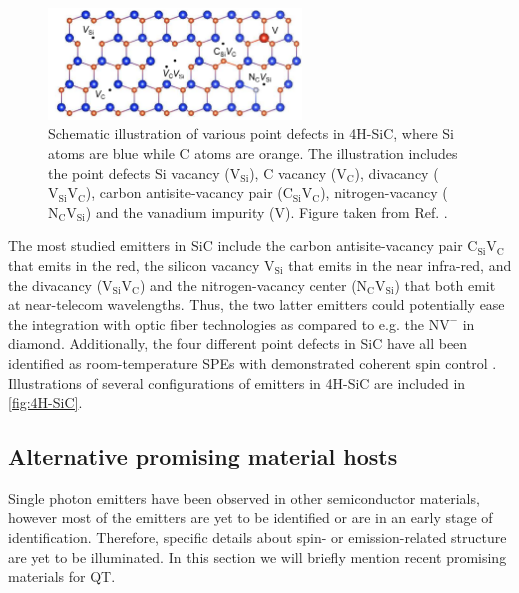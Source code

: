 \begin{figure}
  \centering
  \includegraphics[width=0.6\textwidth]{theory/figures/4H-SiC.png}
  \caption{Schematic illustration of various point defects in 4H-SiC, where Si atoms are blue while C atoms are orange. The illustration includes the point defects Si vacancy ($\text{V}_{\text{Si}}$), C vacancy ($\text{V}_{\text{C}}$), divacancy ($\text{V}_{\text{Si}}\text{V}_{\text{C}}$), carbon antisite-vacancy pair ($\text{C}_{\text{Si}}\text{V}_{\text{C}}$), nitrogen-vacancy ($\text{N}_{\text{C}}\text{V}_{\text{Si}}$) and the vanadium impurity ($\text{V}$). Figure taken from Ref. \cite{Bathen2020}.}
  \label{fig:4H-SiC}
\end{figure}

The most studied emitters in SiC include the carbon antisite-vacancy pair $\text{C}_{\text{Si}}\text{V}_{\text{C}}$ that emits in the red, the silicon vacancy $\text{V}_{\text{Si}}$ that emits in the near infra-red, and the divacancy ($\text{V}_{\text{Si}}\text{V}_{\text{C}}$) and the nitrogen-vacancy center ($\text{N}_{\text{C}}\text{V}_{\text{Si}}$) that both emit at near-telecom wavelengths. Thus, the two latter emitters could potentially ease the integration with optic fiber technologies as compared to e.g. the $\text{NV}^{-}$ in diamond. Additionally, the four different point defects in SiC have all been identified as room-temperature SPEs with demonstrated coherent spin control \cite{Widmann2014, Kraus2013, Castelletto2013, Koehl2011, Bathen2019}. Illustrations of several configurations of emitters in 4H-SiC are included in \autoref{fig:4H-SiC}.

\subsection{Alternative promising material hosts}
\label{promising-material-hosts}

Single photon emitters have been observed in other semiconductor materials, however most of the emitters are yet to be identified or are in an early stage of identification. Therefore, specific details about spin- or emission-related structure are yet to be illuminated. In this section we will briefly mention recent promising materials for QT.

